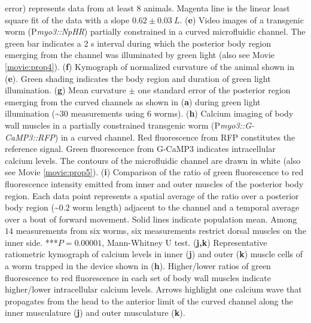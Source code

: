 \begin{FPfigure}
{error) represents data from at least 8 animals. Magenta line is the linear least square fit of the 
data with a slope $0.62 \pm 0.03~L$.  
(\textbf{e}) Video images of a transgenic worm (P\textit{myo3::NpHR}) partially constrained in a curved 
microfluidic channel. The green bar indicates a $2$ s interval during which the posterior body 
region emerging from the channel was illuminated by green light (also see Movie  \ref{movie:prop4}). 
(\textbf{f}) Kymograph of normalized curvature of the animal shown in (\textbf{e}). Green shading indicates the 
body region and duration of green light illumination.  
(\textbf{g}) Mean curvature $\pm$ one standard error of the posterior region emerging from the curved 
channels as shown in (\textbf{a}) during green light illumination (\textasciitilde$30$ measurements using 6 worms). 
(\textbf{h}) Calcium imaging of body wall muscles in a partially constrained transgenic worm 
(P\textit{myo3::G-CaMP3::RFP}) in a curved channel. Red fluorescence from RFP constitutes the 
reference signal. Green fluorescence from G-CaMP3 indicates intracellular calcium levels. The 
contours of the microfluidic channel are drawn in white (also see Movie  \ref{movie:prop5}). 
(\textbf{i}) Comparison of the ratio of green fluorescence to red fluorescence intensity emitted from inner 
and outer muscles of the posterior body region. Each data point represents a spatial average of 
the ratio over a posterior body region (\textasciitilde$0.2$ worm length) adjacent to the channel and a temporal 
average over a bout of forward movement. Solid lines indicate population mean. Among $14$ 
measurements from six worms, six measurements restrict dorsal muscles on the inner side. ***$P= 0.00001$, Mann-Whitney U test. 
(\textbf{j,k}) Representative ratiometric kymograph of calcium levels in inner (\textbf{j}) and outer (\textbf{k}) muscle 
cells of a worm trapped in the device shown in (\textbf{h}). Higher/lower ratios of green fluorescence to 
red fluorescence in each set of body wall muscles indicate higher/lower intracellular calcium 
levels. Arrows highlight one calcium wave that propagates from the head to the anterior limit of 
the curved channel along the inner musculature (\textbf{j}) and outer musculature (\textbf{k}).\label{fig:prop2}}
\end{FPfigure}


